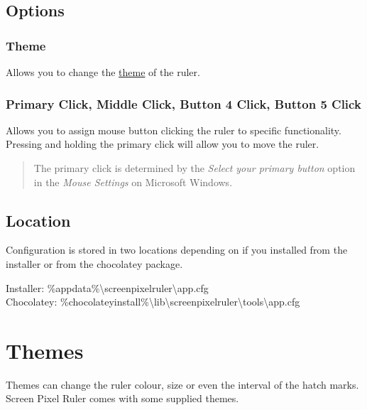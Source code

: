 \documentclass[
]{book}
\begin{document}
\hypertarget{options}{%
\section{Options}\label{options}}

\hypertarget{theme}{%
\subsection{Theme}\label{theme}}

Allows you to change the \protect\hyperlink{themes}{theme} of the ruler.

\hypertarget{primary-click-middle-click-button-4-click-button-5-click}{%
\subsection{Primary Click, Middle Click, Button 4 Click, Button 5 Click}\label{primary-click-middle-click-button-4-click-button-5-click}}

Allows you to assign mouse button clicking the ruler to specific functionality.
Pressing and holding the primary click will allow you to move the ruler.

\begin{quote}
The primary click is determined by the \emph{Select your primary button} option in the \emph{Mouse Settings} on Microsoft Windows.
\end{quote}

\hypertarget{location}{%
\section{Location}\label{location}}

Configuration is stored in two locations depending on if you installed from the installer or from the chocolatey package.

Installer: \%appdata\%\textbackslash screenpixelruler\textbackslash app.cfg\\
Chocolatey: \%chocolateyinstall\%\textbackslash lib\textbackslash screenpixelruler\textbackslash tools\textbackslash app.cfg

\hypertarget{themes}{%
\chapter{Themes}\label{themes}}

Themes can change the ruler colour, size or even the interval of the hatch marks.
Screen Pixel Ruler comes with some supplied themes.
\end{document}
